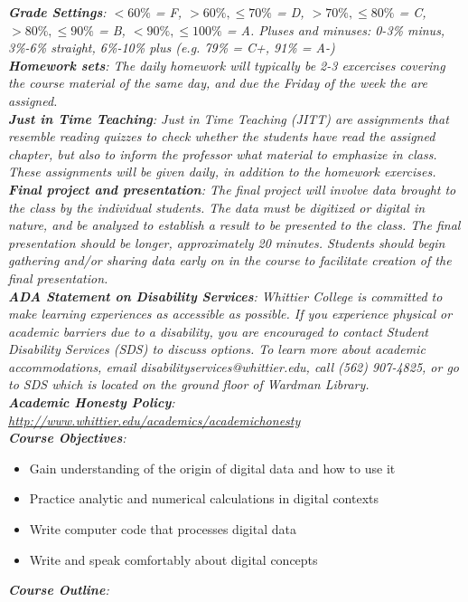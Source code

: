 \documentclass[10pt]{article}
\begin{document}
\textit{\textbf{Grade Settings}: $<60\%$ = F, $>60\%,\leq 70\%$ = D, $>70\%,\leq80\%$ = C, $>80\%,\leq 90\%$ = B, $<90\%,\leq 100\%$ = A.  Pluses and minuses: 0-3\% minus, 3\%-6\% straight, 6\%-10\% plus (e.g. 79\% = C+, 91\% = A-)} \\
\textit{\textbf{Homework sets}: The daily homework will typically be 2-3 excercises covering the course material of the same day, and due the Friday of the week the are assigned.} \\
\textit{\textbf{Just in Time Teaching}: Just in Time Teaching (JITT) are assignments that resemble reading quizzes to check whether the students have read the assigned chapter, but also to inform the professor what material to emphasize in class.  These assignments will be given daily, in addition to the homework exercises.} \\
\textit{\textbf{Final project and presentation}: The final project will involve data brought to the class by the individual students.  The data must be digitized or digital in nature, and be analyzed to establish a result to be presented to the class.  The final presentation should be longer, approximately 20 minutes.  Students should begin gathering and/or sharing data early on in the course to facilitate creation of the final presentation.} \\
\textit{\textbf{ADA Statement on Disability Services}: Whittier College is committed to make learning experiences as accessible as possible. If you experience physical or academic barriers due to a disability, you are encouraged to contact Student Disability Services (SDS) to discuss options. To learn more about academic accommodations, email disabilityservices@whittier.edu, call (562) 907-4825, or go to SDS which is located on the ground floor of Wardman Library.} \\
\textit{\textbf{Academic Honesty Policy}: \url{http://www.whittier.edu/academics/academichonesty}} \\
\textit{\textbf{Course Objectives}:}
\begin{itemize}
\item Gain understanding of the origin of digital data and how to use it
\item Practice analytic and numerical calculations in digital contexts
\item Write computer code that processes digital data
\item Write and speak comfortably about digital concepts
\end{itemize}
\clearpage
\textit{\textbf{Course Outline}:}
\end{document}

